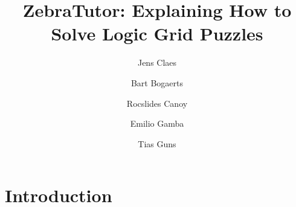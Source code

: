 \documentclass[runningheads]{llncs}
\newcommand{\zebratutor}{ZebraTutor\xspace}
\newcommand{\ourtool}{\zebratutor}
\newcommand{\idp}{IDP\xspace}
\begin{document}
%
\title{\zebratutor: Explaining How to Solve Logic Grid Puzzles}
%
%
\author{Jens Claes \and
Bart Bogaerts \and
Rocslides Canoy \and 
Emilio Gamba \and 
Tias Guns }
%
%
%
\maketitle              %
%
% 
%
%
%
\section{Introduction}
% 
\end{document}
